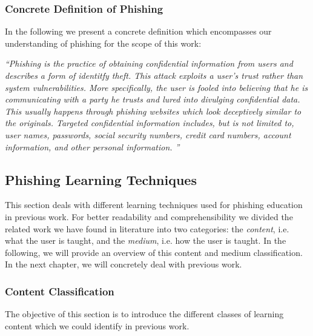 \subsubsection{Concrete Definition of Phishing}
In the following we present a concrete definition which encompasses our understanding of phishing for the scope of this work:

\begin{center}
\textit{``Phishing is the practice of obtaining confidential information from users and describes a form of identitfy theft. This attack exploits a user's trust rather than system vulnerabilities. More specifically, the user is fooled into believing that he is communicating with a party he trusts and lured into divulging confidential data. This usually happens through phishing websites which look deceptively similar to the originals. Targeted confidential information includes, but is not limited to, user names, passwords, social security numbers, credit card numbers, account information, and other personal information.
''}
\end{center}

\subsection{Phishing Learning Techniques}

This section deals with different learning techniques used for phishing education in previous work.
 For better readability and comprehensibility we divided the related work we have found in literature into two categories: the \textit{content}, i.e.
 what the user is taught, and the 
\textit{medium}, i.e. how the user is taught.
 In the following, we will provide an overview of this content and medium classification.
 In the next chapter, we will concretely deal with previous work.


\subsubsection{Content Classification}
\label{s:content_classification}
The objective of this section is to introduce the different classes of learning content which we could identify in previous work.

